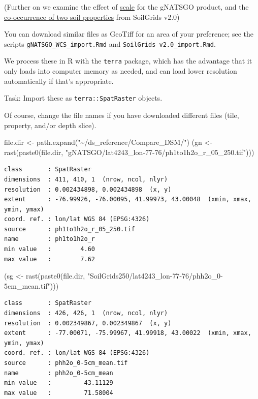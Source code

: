 \documentclass[
  letterpaper,
  DIV=11,
  numbers=noendperiod]{scrartcl}
\newenvironment{Shaded}{\begin{snugshade}}{\end{snugshade}}
\newcommand{\FunctionTok}[1]{\textcolor[rgb]{0.28,0.35,0.67}{#1}}
\newcommand{\NormalTok}[1]{\textcolor[rgb]{0.00,0.23,0.31}{#1}}
\newcommand{\OtherTok}[1]{\textcolor[rgb]{0.00,0.23,0.31}{#1}}
\newcommand{\StringTok}[1]{\textcolor[rgb]{0.13,0.47,0.30}{#1}}
\begin{document}
(Further on we examine the effect of \protect\hyperlink{scale}{scale}
for the gNATSGO product, and the
\protect\hyperlink{incove}{co-occurrence of two soil properties} from
SoilGrids v2.0)

You can download similar files as GeoTiff for an area of your
preference; see the scripts \texttt{gNATSGO\_WCS\_import.Rmd} and
\texttt{SoilGrids\ v2.0\_import.Rmd}.

We process these in R with the \texttt{terra} package, which has the
advantage that it only loads into computer memory as needed, and can
load lower resolution automatically if that's appropriate.

Task: Import these as \texttt{terra::SpatRaster} objects.

Of course, change the file names if you have downloaded different files
(tile, property, and/or depth slice).

\begin{Shaded}
\begin{Highlighting}[]
\NormalTok{file.dir }\OtherTok{\textless{}{-}} \FunctionTok{path.expand}\NormalTok{(}\StringTok{"\textasciitilde{}/ds\_reference/Compare\_DSM/"}\NormalTok{)}
\NormalTok{(gn }\OtherTok{\textless{}{-}} \FunctionTok{rast}\NormalTok{(}\FunctionTok{paste0}\NormalTok{(file.dir, }\StringTok{"gNATSGO/lat4243\_lon{-}77{-}76/ph1to1h2o\_r\_05\_250.tif"}\NormalTok{)))}
\end{Highlighting}
\end{Shaded}

\begin{verbatim}
class       : SpatRaster 
dimensions  : 411, 410, 1  (nrow, ncol, nlyr)
resolution  : 0.002434898, 0.002434898  (x, y)
extent      : -76.99926, -76.00095, 41.99973, 43.00048  (xmin, xmax, ymin, ymax)
coord. ref. : lon/lat WGS 84 (EPSG:4326) 
source      : ph1to1h2o_r_05_250.tif 
name        : ph1to1h2o_r 
min value   :        4.60 
max value   :        7.62 
\end{verbatim}

\begin{Shaded}
\begin{Highlighting}[]
\NormalTok{(sg }\OtherTok{\textless{}{-}} \FunctionTok{rast}\NormalTok{(}\FunctionTok{paste0}\NormalTok{(file.dir, }\StringTok{"SoilGrids250/lat4243\_lon{-}77{-}76/phh2o\_0{-}5cm\_mean.tif"}\NormalTok{)))}
\end{Highlighting}
\end{Shaded}

\begin{verbatim}
class       : SpatRaster 
dimensions  : 426, 426, 1  (nrow, ncol, nlyr)
resolution  : 0.002349867, 0.002349867  (x, y)
extent      : -77.00071, -75.99967, 41.99918, 43.00022  (xmin, xmax, ymin, ymax)
coord. ref. : lon/lat WGS 84 (EPSG:4326) 
source      : phh2o_0-5cm_mean.tif 
name        : phh2o_0-5cm_mean 
min value   :         43.11129 
max value   :         71.58004 
\end{verbatim}
\end{document}
